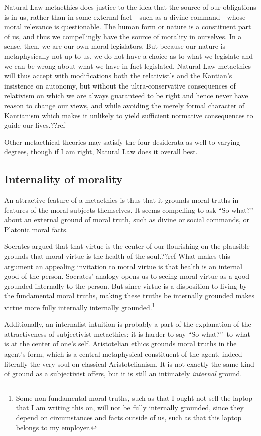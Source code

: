 Natural Law metaethics does justice to the idea that the source of our obligations is in us, rather than in some external fact---such as
a divine command---whose moral relevance is questionable. 
The human form or nature is a constituent part of us, and thus we compellingly have the source of morality in ourselves.
In a sense, then, we are our own moral legislators. But because our nature is metaphysically not
up to us, we do not have a choice as to what we legislate and we can be wrong about what we have in fact legislated. Natural Law
metaethics will thus accept with modifications both the relativist's and the Kantian's insistence on autonomy, but without the
ultra-conservative consequences of relativism on which we are always guaranteed to be right and hence never have reason
to change our views, and while avoiding the merely formal character of Kantianism which makes it unlikely to yield sufficient
normative consequences to guide our lives.??ref 

Other metaethical theories may satisfy the four desiderata as well to varying degrees, though if I am right, Natural 
Law does it overall best.

\subsection{Internality of morality}
An attractive feature of a metaethics is thus that it grounds moral truths in features of the moral subjects themselves. It seems 
compelling to ask ``So what?'' about an external ground of moral truth, such as divine or social commands, or Platonic 
moral facts. 

Socrates argued that that virtue is the center of our flourishing on the plausible grounds that moral virtue is the health 
of the soul.??ref What makes this argument an appealing invitation to moral virtue is that health is an internal good of 
the person. Socrates' analogy opens us to seeing moral virtue as a good grounded internally to the person. But since virtue
is a disposition to living by the fundamental moral truths, making these truths be internally grounded makes virtue
more fully internally internally grounded.\footnote{Some non-fundamental moral truths, such as that I ought not sell
the laptop that I am writing this on, will not be fully internally grounded,
since they depend on circumstances and facts outside of us, such as that this laptop belongs to my employer.}

Additionally, an internalist intuition is probably a part of the explanation of the 
attractiveness of subjectivist metaethics: it is harder to say ``So what?''\ to what is at the center of 
one's self. 
Aristotelian ethics grounds moral truths in the agent's form, which is a central metaphysical constituent of the agent,
indeed literally the very soul on classical Aristotelianism. 
It is not exactly the same kind of ground as a subjectivist offers, but it is still an intimately \textit{internal} ground.

